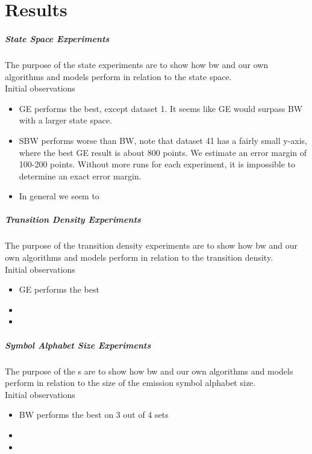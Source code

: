 \FloatBarrier

\chapter{Results}\label{sec:results}

\paragraph{State Space Experiments}

The purpose of the state experiments are to show how \gls{bw} and our own algorithms and models perform in relation to the state space.\\

	

Initial observations
\begin{itemize}
\item GE performs the best, except dataset 1. It seems like GE would surpass BW with a larger state space.
\item SBW performs worse than BW, note that dataset 41 has a fairly small y-axis, where the best GE result is about 800 points. We estimate an error margin of 100-200 points. Without more runs for each experiment, it is impossible to determine an exact error margin.
\item In general we seem to 
\end{itemize}


\paragraph{Transition Density Experiments}

The purpose of the transition density experiments are to show how \gls{bw} and our own algorithms and models perform in relation to the transition density.\\

	

Initial observations
\begin{itemize}
\item GE performs the best
\item 
\item 
\end{itemize}

\paragraph{Symbol Alphabet Size Experiments}
The purpose of the s are to show how \gls{bw} and our own algorithms and models perform in relation to the size of the emission symbol alphabet size.\\

	
	
Initial observations
\begin{itemize}
\item BW performs the best on 3 out of 4 sets
\item 
\item 
\end{itemize}	
	
